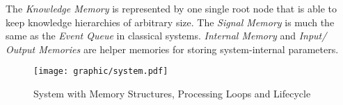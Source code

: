 The \emph{Knowledge Memory} is represented by one single root node that is able
to keep knowledge hierarchies of arbitrary size. The \emph{Signal Memory} is
much the same as the \emph{Event Queue} in classical systems.
\emph{Internal Memory} and \emph{Input/ Output Memories} are helper memories
for storing system-internal parameters.

\begin{figure}[ht]
    \begin{center}
        \texttt{[image: graphic/system.pdf]}
        \caption{System with Memory Structures, Processing Loops and Lifecycle}
        \label{system_figure}
    \end{center}
\end{figure}
